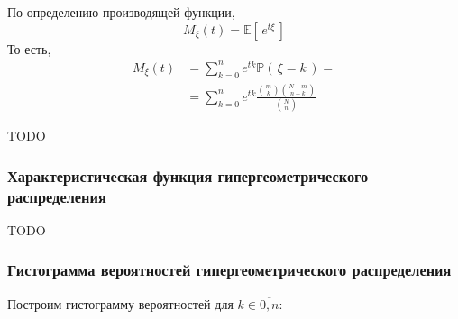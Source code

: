 \documentclass[
  russian,
  a4paper,
  russian]{scrreprt}
\begin{document}
По определению производящей функции,
\[M_\xi(t) = \mathbb{E}\left[\, e^{t\xi} \,\right]\] То есть,
\[\begin{aligned}
    M_\xi(t) &= \sum_{k=0}^{n} e^{tk}\mathbb{P}\left(\, \xi=k \,\right) =\\
             &= \sum_{k=0}^{n} e^{tk}\frac{\binom{m}{k}\binom{N-m}{n-k}}{\binom{N}{n}}
\end{aligned}\]

TODO

\hypertarget{ux445ux430ux440ux430ux43aux442ux435ux440ux438ux441ux442ux438ux447ux435ux441ux43aux430ux44f-ux444ux443ux43dux43aux446ux438ux44f-ux433ux438ux43fux435ux440ux433ux435ux43eux43cux435ux442ux440ux438ux447ux435ux441ux43aux43eux433ux43e-ux440ux430ux441ux43fux440ux435ux434ux435ux43bux435ux43dux438ux44f}{%
\subsubsection{Характеристическая функция гипергеометрического
распределения}\label{ux445ux430ux440ux430ux43aux442ux435ux440ux438ux441ux442ux438ux447ux435ux441ux43aux430ux44f-ux444ux443ux43dux43aux446ux438ux44f-ux433ux438ux43fux435ux440ux433ux435ux43eux43cux435ux442ux440ux438ux447ux435ux441ux43aux43eux433ux43e-ux440ux430ux441ux43fux440ux435ux434ux435ux43bux435ux43dux438ux44f}}

TODO

\hypertarget{ux433ux438ux441ux442ux43eux433ux440ux430ux43cux43cux430-ux432ux435ux440ux43eux44fux442ux43dux43eux441ux442ux435ux439-ux433ux438ux43fux435ux440ux433ux435ux43eux43cux435ux442ux440ux438ux447ux435ux441ux43aux43eux433ux43e-ux440ux430ux441ux43fux440ux435ux434ux435ux43bux435ux43dux438ux44f}{%
\subsubsection{Гистограмма вероятностей гипергеометрического
распределения}\label{ux433ux438ux441ux442ux43eux433ux440ux430ux43cux43cux430-ux432ux435ux440ux43eux44fux442ux43dux43eux441ux442ux435ux439-ux433ux438ux43fux435ux440ux433ux435ux43eux43cux435ux442ux440ux438ux447ux435ux441ux43aux43eux433ux43e-ux440ux430ux441ux43fux440ux435ux434ux435ux43bux435ux43dux438ux44f}}

Построим гистограмму вероятностей для \(k \in \overline{0, n}\):
\end{document}
